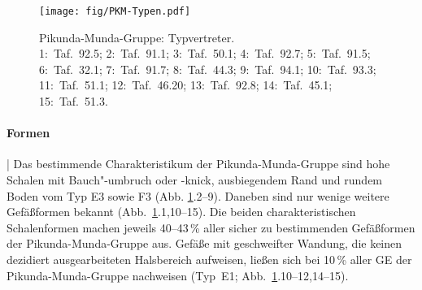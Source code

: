 \begin{figure}[p]
	\centering
	\texttt{[image: fig/PKM-Typen.pdf]}
	\caption{Pikunda-Munda-Gruppe: Typvertreter.\\1:~Taf.~92.5; 2:~Taf.~91.1; 3:~Taf.~50.1; 4:~Taf.~92.7; 5:~Taf.~91.5; 6:~Taf.~32.1; 7:~Taf.~91.7; 8:~Taf.~44.3; 9:~Taf.~94.1; 10:~Taf.~93.3; 11:~Taf.~51.1; 12:~Taf.~46.20; 13:~Taf.~92.8; 14:~Taf.~45.1; 15:~Taf.~51.3.}
	\label{fig:PIKMUN_TypVertreter}
\end{figure}

\paragraph{Formen}\hspace{-.5em}|\hspace{.5em}%
Das bestimmende Charakteristikum der Pikunda-Munda-Gruppe sind hohe Schalen mit Bauch"-umbruch oder -knick, ausbiegendem Rand und rundem Boden vom Typ E3 sowie F3 (Abb. \ref{fig:PIKMUN_TypVertreter}.2--9). Daneben sind nur wenige weitere Gefäßformen bekannt (Abb.~\ref{fig:PIKMUN_TypVertreter}.1,10--15). Die beiden charakteristischen Schalenformen machen jeweils 40--43\,\% aller sicher zu bestimmenden Gefäßformen der Pikunda-Munda-Gruppe aus. Gefäße mit geschweifter Wandung, die keinen dezidiert ausgearbeiteten Halsbereich aufweisen, ließen sich bei 10\,\% aller GE der Pikunda-Munda-Gruppe nachweisen (Typ~E1; Abb.~\ref{fig:PIKMUN_TypVertreter}.10--12,14--15).\vspace{1em}

